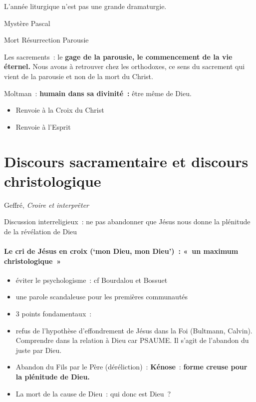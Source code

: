 L'année liturgique n'est pas une grande dramaturgie.

Mystère Pascal

Mort Résurrection Parousie

Les sacrements~: le \textbf{gage de la parousie, le commencement de la
vie éternel.} Nous avons à retrouver chez les orthodoxes, ce sens du
sacrement qui vient de la parousie et non de la mort du Christ.

Moltman~: \textbf{humain dans sa divinité~:} être même de Dieu.

\begin{itemize}
\item
   
  Renvoie à la Croix du Christ
   
\item
   
  Renvoie à l'Esprit
   
\end{itemize}

\hypertarget{discours-sacramentaire-et-discours-christologique}{%
\section{Discours sacramentaire et discours
christologique}\label{discours-sacramentaire-et-discours-christologique}}

Geffré, \emph{Croire et interprêter}

Discussion interreligieux~: ne pas abandonner que Jésus nous donne la
plénitude de la révélation de Dieu

\hypertarget{le-cri-de-juxe9sus-en-croix-mon-dieu-mon-dieu-un-maximum-christologique}{%
\paragraph{Le cri de Jésus en croix (`mon Dieu, mon Dieu')~:
«~un maximum
christologique~»}\label{le-cri-de-juxe9sus-en-croix-mon-dieu-mon-dieu-un-maximum-christologique}}

\begin{itemize}
\item
  éviter le psychologisme~: cf Bourdalou et Bossuet
\item
  une parole scandaleuse pour les premières communautés
\item
  3 points fondamentaux~:
\item
   
  refus de l'hypothèse d'effondrement de Jésus dans la Foi (Bultmann,
  Calvin). Comprendre dans la relation à Dieu car PSAUME. Il s'agit de
  l'abandon du juste par Dieu.
   
\item
   
  Abandon du Fils par le Père (déréliction)~: \textbf{Kénose}~:
  \textbf{forme creuse pour la plénitude de Dieu.}
   
\item
   
  La mort de la cause de Dieu~: qui donc est Dieu~?
   
\end{itemize}

